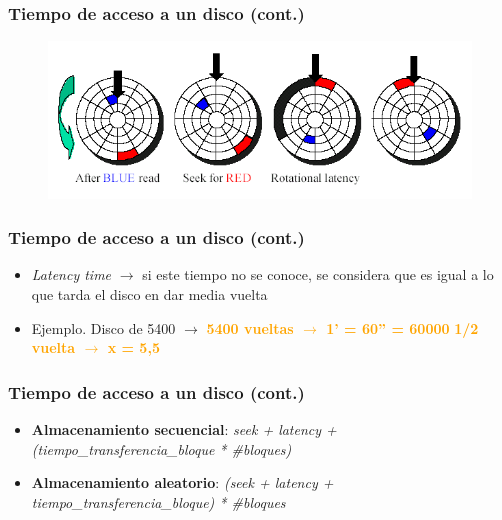 \begin{frame}
  \frametitle{Tiempo de acceso a un disco (cont.)}
  \begin{figure}
      \includegraphics[scale=0.5]{images/dat2.png}
  \end{figure}
\end{frame}

\begin{frame}
  \frametitle{Tiempo de acceso a un disco (cont.)}
  \begin{itemize}
    \item \emph{Latency time} $\rightarrow$ si este tiempo no se conoce, se considera que es igual a lo que tarda el disco en dar media vuelta
    \item Ejemplo. Disco de 5400 \rpm $\rightarrow$
      \linebreak
      \linebreak
      \hspace{35pt} \textcolor{orange}{\textbf{5400 vueltas $\rightarrow$ 1' = 60'' = 60000 \ms}}
      \linebreak  
      \hspace{35pt} \textcolor{orange}{\textbf{1/2 vuelta $\rightarrow$ x = 5,5 \ms}}
  \end{itemize}
\end{frame}

\begin{frame}
  \frametitle{Tiempo de acceso a un disco (cont.)}
  \begin{itemize}
    \item \textbf{Almacenamiento secuencial}:
      \linebreak
      \hspace{35pt} \emph{seek + latency + (tiempo\_transferencia\_bloque * \#bloques)}
    \item \textbf{Almacenamiento aleatorio}:
      \linebreak
      \hspace{35pt} \emph{(seek + latency + tiempo\_transferencia\_bloque) * \#bloques}      
  \end{itemize}
\end{frame}

